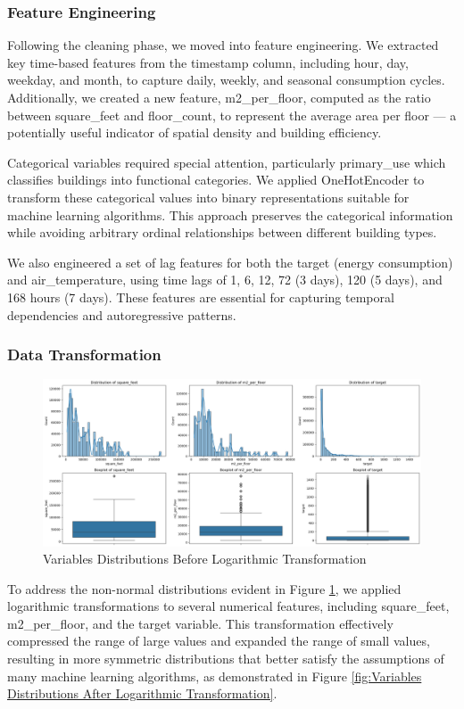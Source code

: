 \subsubsection{Feature Engineering}
Following the cleaning phase, we moved into feature engineering. We extracted key time-based features from the timestamp column, including hour, day, weekday, and month, to capture daily, weekly, and seasonal consumption cycles. Additionally, we created a new feature, m2\_per\_floor, computed as the ratio between square\_feet and floor\_count, to represent the average area per floor — a potentially useful indicator of spatial density and building efficiency.

Categorical variables required special attention, particularly primary\_use which classifies buildings into functional categories. We applied OneHotEncoder to transform these categorical values into binary representations suitable for machine learning algorithms. This approach preserves the categorical information while avoiding arbitrary ordinal relationships between different building types.

We also engineered a set of lag features for both the target (energy consumption) and air\_temperature, using time lags of 1, 6, 12, 72 (3 days), 120 (5 days), and 168 hours (7 days). These features are essential for capturing temporal dependencies and autoregressive patterns.

\subsubsection{Data Transformation}

\begin{figure}[!h]
    \centering
    \includegraphics[width=1\linewidth]{images/non-distrib.png}
    \caption{Variables Distributions Before Logarithmic Transformation}
    \label{fig:non-label}
\end{figure}
To address the non-normal distributions evident in Figure \ref{fig:non-label}, we applied logarithmic transformations to several numerical features, including square\_feet, m2\_per\_floor, and the target variable. This transformation effectively compressed the range of large values and expanded the range of small values, resulting in more symmetric distributions that better satisfy the assumptions of many machine learning algorithms, as demonstrated in Figure \ref{fig:Variables Distributions After Logarithmic Transformation}.


